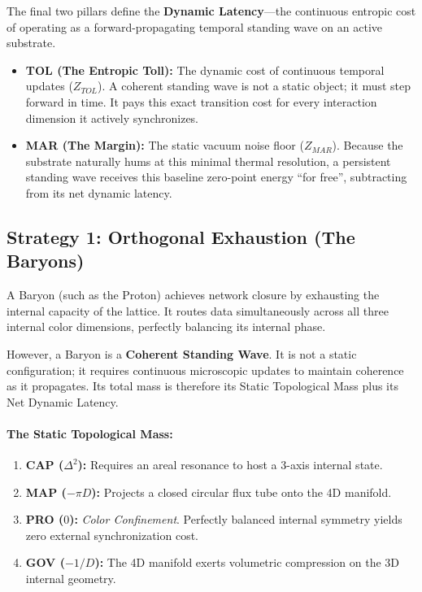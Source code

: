 The final two pillars define the \textbf{Dynamic Latency}---the continuous entropic cost of operating as a forward-propagating temporal standing wave on an active substrate.
\begin{itemize}
    \item \textbf{TOL (The Entropic Toll):} The dynamic cost of continuous temporal updates ($Z_{TOL}$). A coherent standing wave is not a static object; it must step forward in time. It pays this exact transition cost for every interaction dimension it actively synchronizes.
    \item \textbf{MAR (The Margin):} The static vacuum noise floor ($Z_{MAR}$). Because the substrate naturally hums at this minimal thermal resolution, a persistent standing wave receives this baseline zero-point energy ``for free'', subtracting from its net dynamic latency.
\end{itemize}


\subsection{Strategy 1: Orthogonal Exhaustion (The Baryons)}

A Baryon (such as the Proton) achieves network closure by exhausting the internal capacity of the lattice. It routes data simultaneously across all three internal color dimensions, perfectly balancing its internal phase. 

However, a Baryon is a \textbf{Coherent Standing Wave}. It is not a static configuration; it requires continuous microscopic updates to maintain coherence as it propagates. Its total mass is therefore its Static Topological Mass plus its Net Dynamic Latency.

\paragraph{The Static Topological Mass:}
\begin{enumerate}
    \item \textbf{CAP ($\Delta^2$):} Requires an areal resonance to host a 3-axis internal state.
    \item \textbf{MAP ($-\pi D$):} Projects a closed circular flux tube onto the 4D manifold.
    \item \textbf{PRO ($0$):} \textit{Color Confinement}. Perfectly balanced internal symmetry yields zero external synchronization cost.
    \item \textbf{GOV ($-1/D$):} The 4D manifold exerts volumetric compression on the 3D internal geometry.
\end{enumerate}

